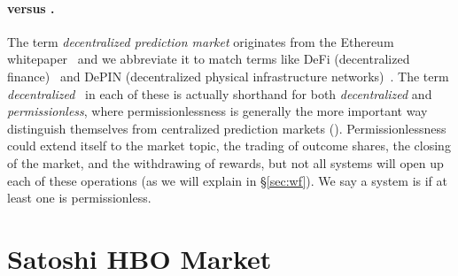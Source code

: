 
\paragraph{\cepm versus \depm.}

The term \textit{decentralized prediction market} originates from the Ethereum whitepaper~\cite{But13} and we abbreviate it \depm to match terms like DeFi (decentralized finance)~\cite{WPG+22} and DePIN (decentralized physical infrastructure networks)~\cite{LWS+24,MEB+25}. The term \textit{decentralized}~\cite{OKK24} in each of these is actually shorthand for both \textit{decentralized} and \textit{permissionless}, where permissionlessness is generally the more important way \depms distinguish themselves from centralized prediction markets (\cepms). Permissionlessness could extend itself to the market topic, the trading of outcome shares, the closing of the market, and the withdrawing of rewards, but not all systems will open up each of these operations (as we will explain in \S\ref{sec:wf}). We say a system is \depm if at least one is permissionless.

 
 \section{Satoshi HBO Market}
\label{sec:hbo}


